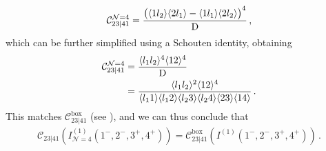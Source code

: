 \begin{align}
\mathcal{C}_{23|41}^{\mathcal{N}=4} = \frac{\bigl(\langle 1 l_2 \rangle \langle 2 l_1 \rangle - \langle 1 l_1 \rangle \langle 2 l_2 \rangle\bigr)^4}{{\rm D}} \,,
\end{align}
which can be further simplified using a Schouten identity, obtaining
\begin{align}
\mathcal{C}_{23|41}^{\mathcal{N}=4} &  = \frac{ \langle l_1 l_2 \rangle^4 \langle 1 2 \rangle^4}{{\rm D}} \nonumber \\
& = \frac{  \langle l_1 l_2 \rangle^2 \langle 1 2 \rangle^4}{\langle l_1 1 \rangle \langle l_1 2 \rangle \langle l_2 3 \rangle \langle l_2 4 \rangle \langle 2 3 \rangle \langle 1 4 \rangle} \,.
\end{align}
This matches $\mathcal{C}_{23|41}^{\text{box}}$ (see ), and we can thus conclude that
\begin{align}
\mathcal{C}_{23|41}\left( I^{(1)}_{\mathcal{N}=4}(1^-,2^-,3^+,4^+) \right) =\mathcal{C}_{23|41}^{\text{box}}\left( I^{(1)}(1^-,2^-,3^+,4^+) \right) \,.
\end{align}



